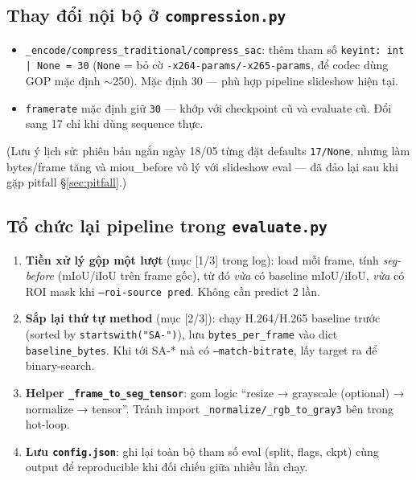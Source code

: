 \documentclass[12pt,a4paper]{article}
\begin{document}
\subsection{Thay đổi nội bộ ở \texttt{compression.py}}

\begin{itemize}[leftmargin=2em]
  \item \texttt{\_encode/compress\_traditional/compress\_sac}: thêm tham số
        \texttt{keyint: int | None = 30} (\texttt{None} = bỏ cờ
        \texttt{-x264-params/-x265-params}, để codec dùng GOP mặc định
        $\sim$250). Mặc định 30 — phù hợp pipeline slideshow hiện tại.
  \item \texttt{framerate} mặc định giữ \texttt{30} — khớp với checkpoint cũ và
        evaluate cũ. Đổi sang 17 chỉ khi dùng sequence thực.
\end{itemize}

(Lưu ý lịch sử: phiên bản ngắn ngày 18/05 từng đặt defaults \texttt{17/None},
nhưng làm bytes/frame tăng và miou\_before vô lý với slideshow eval — đã đảo lại
sau khi gặp pitfall \S\ref{sec:pitfall}.)

\subsection{Tổ chức lại pipeline trong \texttt{evaluate.py}}

\begin{enumerate}[leftmargin=2em]
  \item \textbf{Tiền xử lý gộp một lượt} (mục [1/3] trong log):
        load mỗi frame, tính \emph{seg-before} (mIoU/iIoU trên frame gốc), từ đó
        \emph{vừa} có baseline mIoU/iIoU, \emph{vừa} có ROI mask khi
        \texttt{--roi-source pred}. Không cần predict 2 lần.
  \item \textbf{Sắp lại thứ tự method} (mục [2/3]): chạy H.264/H.265 baseline
        trước (sorted by \texttt{startswith("SA-")}), lưu \texttt{bytes\_per\_frame}
        vào dict \texttt{baseline\_bytes}. Khi tới SA-* mà có
        \texttt{--match-bitrate}, lấy target ra để binary-search.
  \item \textbf{Helper \texttt{\_frame\_to\_seg\_tensor}}: gom logic
        ``resize → grayscale (optional) → normalize → tensor''. Tránh import
        \texttt{\_normalize/\_rgb\_to\_gray3} bên trong hot-loop.
  \item \textbf{Lưu \texttt{config.json}}: ghi lại toàn bộ tham số eval (split,
        flags, ckpt) cùng output để reproducible khi đối chiếu giữa nhiều lần chạy.
\end{enumerate}
\end{document}
